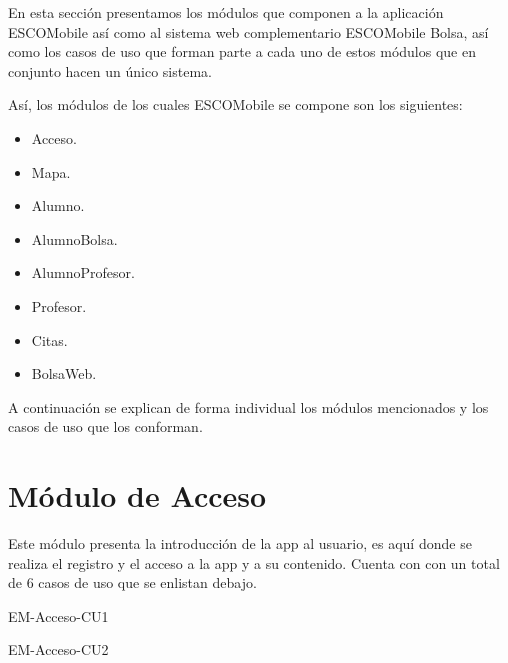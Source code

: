 \noindent
En esta sección presentamos los módulos que componen a la aplicación ESCOMobile así como al sistema web
complementario ESCOMobile Bolsa, así como los casos de uso que forman parte a cada uno de estos módulos
que en conjunto hacen un único sistema.   

\noindent
\newline
Así, los módulos de los cuales ESCOMobile se compone son los siguientes: 
	\begin{itemize}
        \item Acceso.
        \item Mapa.
        \item Alumno.
        \item AlumnoBolsa.
        \item AlumnoProfesor.
        \item Profesor.
        \item Citas.
        \item BolsaWeb.
	\end{itemize}

\noindent
A continuación se explican de forma individual los módulos mencionados y los casos de uso que los conforman. 




\section{Módulo de Acceso}

\noindent
Este módulo presenta la introducción de la app al usuario, es aquí donde se realiza el registro y el acceso 
a la app y a su contenido. Cuenta con con un total de 6 casos de uso que se enlistan debajo.

\begin{requisitos}{EM-Acceso-CU1}
\end{requisitos}

\begin{requisitos}{EM-Acceso-CU2}
\end{requisitos}

